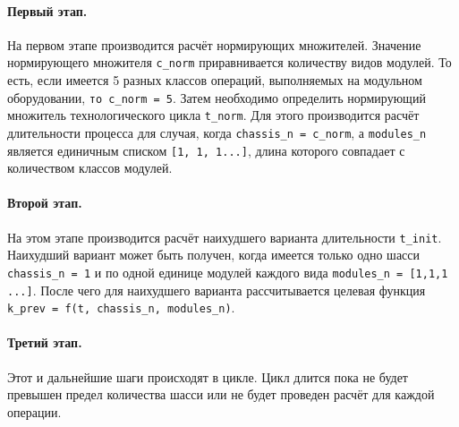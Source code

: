\paragraph{Первый этап.} На первом этапе производится расчёт нормирующих множителей. Значение нормирующего множителя \texttt{c\_norm} приравнивается  количеству видов модулей. То есть, если имеется 5 разных классов операций, выполняемых на модульном оборудовании, \texttt{то c\_norm = 5}. Затем необходимо определить нормирующий множитель технологического цикла \texttt{t\_norm}. Для этого производится расчёт длительности процесса для случая, когда \texttt{chassis\_n = c\_norm}, а \texttt{modules\_n} является единичным списком \texttt{[1, 1, 1...]}, длина которого совпадает с количеством классов модулей.  
 
\paragraph{Второй этап.} На этом этапе производится расчёт наихудшего варианта длительности \texttt{t\_init}.
Наихудший вариант может быть получен, когда имеется только одно шасси \texttt{chassis\_n = 1} и по одной единице модулей каждого вида \texttt{modules\_n = [1,1,1 ...]}. После чего для наихудшего варианта рассчитывается целевая функция \texttt{k\_prev = f(t, chassis\_n, modules\_n)}.

\paragraph{Третий этап.} Этот и дальнейшие шаги происходят в цикле. Цикл длится пока не будет превышен предел количества шасси или не будет проведен расчёт для каждой операции.

